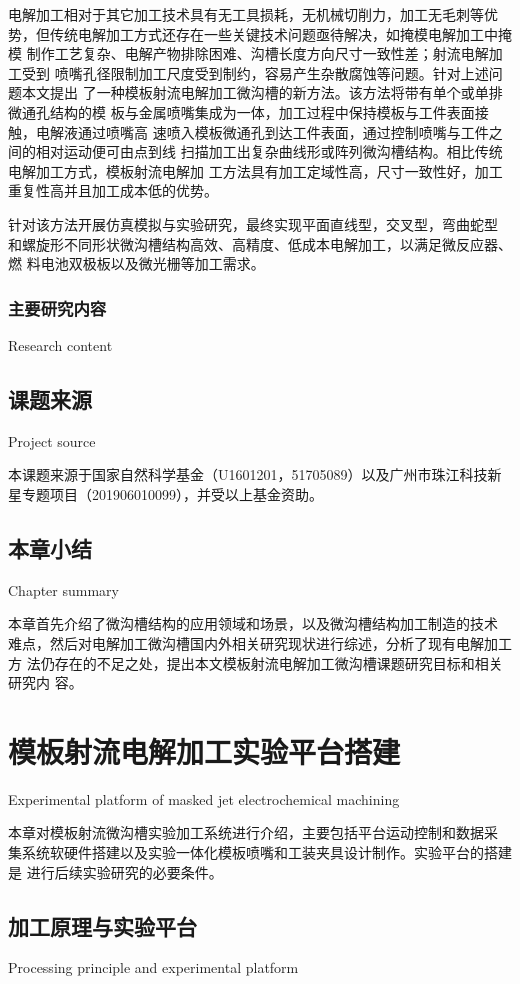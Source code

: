 \documentclass[
  type=doctor
]{../gdutthesis}
\begin{document}
电解加工相对于其它加工技术具有无工具损耗，无机械切削力，加工无毛刺等优
势，但传统电解加工方式还存在一些关键技术问题亟待解决，如掩模电解加工中掩模
制作工艺复杂、电解产物排除困难、沟槽长度方向尺寸一致性差；射流电解加工受到
喷嘴孔径限制加工尺度受到制约，容易产生杂散腐蚀等问题。针对上述问题本文提出
了一种模板射流电解加工微沟槽的新方法。该方法将带有单个或单排微通孔结构的模
板与金属喷嘴集成为一体，加工过程中保持模板与工件表面接触，电解液通过喷嘴高
速喷入模板微通孔到达工件表面，通过控制喷嘴与工件之间的相对运动便可由点到线
扫描加工出复杂曲线形或阵列微沟槽结构。相比传统电解加工方式，模板射流电解加
工方法具有加工定域性高，尺寸一致性好，加工重复性高并且加工成本低的优势。

针对该方法开展仿真模拟与实验研究，最终实现平面直线型，交叉型，弯曲蛇型
和螺旋形不同形状微沟槽结构高效、高精度、低成本电解加工，以满足微反应器、燃
料电池双极板以及微光栅等加工需求。

\subsection{主要研究内容}{Research content}

\section{课题来源}{Project source}

本课题来源于国家自然科学基金（U1601201，51705089）以及广州市珠江科技新
星专题项目（201906010099），并受以上基金资助。

\section{本章小结}{Chapter summary}

本章首先介绍了微沟槽结构的应用领域和场景，以及微沟槽结构加工制造的技术
难点，然后对电解加工微沟槽国内外相关研究现状进行综述，分析了现有电解加工方
法仍存在的不足之处，提出本文模板射流电解加工微沟槽课题研究目标和相关研究内
容。

\chapter{模板射流电解加工实验平台搭建}{Experimental platform of masked jet electrochemical machining}

本章对模板射流微沟槽实验加工系统进行介绍，主要包括平台运动控制和数据采
集系统软硬件搭建以及实验一体化模板喷嘴和工装夹具设计制作。实验平台的搭建是
进行后续实验研究的必要条件。

\section{加工原理与实验平台}{Processing principle and experimental platform}
\end{document}
